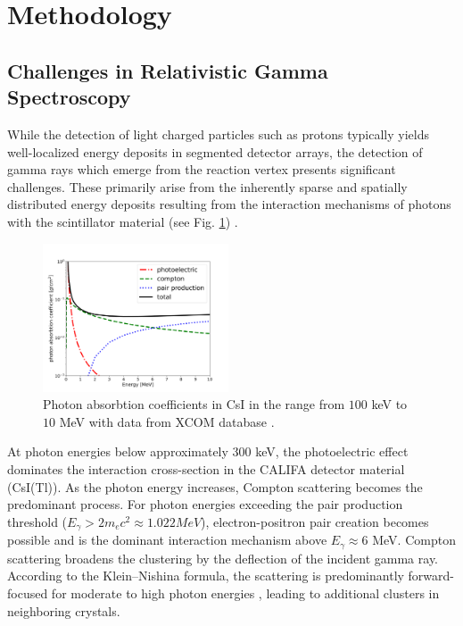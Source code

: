 \documentclass[final,5p,times,twocolumn]{elsarticle}
\begin{document}
\section{Methodology}
\label{sec:metho}
\subsection{Challenges in Relativistic Gamma Spectroscopy}\label{s_sec:gamma_spec}
While the detection of light charged particles such as protons typically yields well-localized energy deposits in segmented detector arrays, the detection of gamma rays which emerge from the reaction vertex presents significant challenges. These primarily arise from the inherently sparse and spatially distributed energy deposits resulting from the interaction mechanisms of photons with the scintillator material (see Fig. \ref{fig:csi}) \cite{kolanoski2016teilchendetektoren}.\newline
\begin{figure}[!htb]
	\centering 
	\includegraphics[width=0.49\textwidth]{csi_attuenuation.png}	
	\caption{Photon absorbtion coefficients in CsI in the range from $100$ keV to $10$ MeV with data from XCOM database \cite{seltzer2010xcom}.} 
	\label{fig:csi}%
\end{figure}
At photon energies below approximately $300$ keV, the photoelectric effect dominates the interaction cross-section in the CALIFA detector material (CsI(Tl)). As the photon energy increases, Compton scattering becomes the predominant process. For photon energies exceeding the pair production threshold ($E_{\gamma} > 2m_{e}c^2 \approx 1.022 MeV$), electron-positron pair creation becomes possible and is the dominant interaction mechanism above $E_{\gamma} \approx 6$ MeV.\newline
Compton scattering broadens the clustering by the deflection of the incident gamma ray. According to the Klein–Nishina formula, the scattering is predominantly forward-focused for moderate to high photon energies \cite{klein1929streuung}, leading to additional clusters in neighboring crystals.\newline
\end{document}
